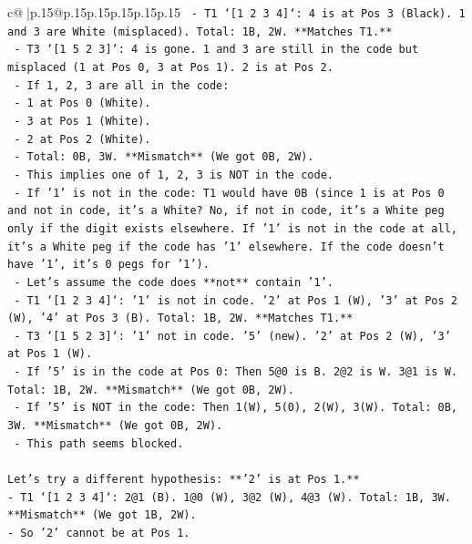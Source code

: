 \documentclass{article}
\begin{document}
{\begin{supertabular}{c@{$\;$}|p{.15\linewidth}@{}p{.15\linewidth}p{.15\linewidth}p{.15\linewidth}p{.15\linewidth}p{.15\linewidth}}
{{{\texttt{        {-} T1 `{[}1 2 3 4{]}`: 4 is at Pos 3 (Black). 1 and 3 are White (misplaced). Total: 1B, 2W. **Matches T1.**} \\
\texttt{        {-} T3 `{[}1 5 2 3{]}`: 4 is gone. 1 and 3 are still in the code but misplaced (1 at Pos 0, 3 at Pos 1). 2 is at Pos 2.} \\
\texttt{        {-} If 1, 2, 3 are all in the code:} \\
\texttt{          {-} 1 at Pos 0 (White).} \\
\texttt{          {-} 3 at Pos 1 (White).} \\
\texttt{          {-} 2 at Pos 2 (White).} \\
\texttt{          {-} Total: 0B, 3W. **Mismatch** (We got 0B, 2W).} \\
\texttt{        {-} This implies one of 1, 2, 3 is NOT in the code.} \\
\texttt{        {-} If '1' is not in the code: T1 would have 0B (since 1 is at Pos 0 and not in code, it's a White? No, if not in code, it's a White peg only if the digit exists elsewhere. If '1' is not in the code at all, it's a White peg if the code has '1' elsewhere. If the code doesn't have '1', it's 0 pegs for '1').} \\
\texttt{        {-} Let's assume the code does **not** contain '1'.} \\
\texttt{          {-} T1 `{[}1 2 3 4{]}`: '1' is not in code. '2' at Pos 1 (W), '3' at Pos 2 (W), '4' at Pos 3 (B). Total: 1B, 2W. **Matches T1.**} \\
\texttt{          {-} T3 `{[}1 5 2 3{]}`: '1' not in code. '5' (new). '2' at Pos 2 (W), '3' at Pos 1 (W).} \\
\texttt{          {-} If '5' is in the code at Pos 0: Then 5@0 is B. 2@2 is W. 3@1 is W. Total: 1B, 2W. **Mismatch** (We got 0B, 2W).} \\
\texttt{          {-} If '5' is NOT in the code: Then 1(W), 5(0), 2(W), 3(W). Total: 0B, 3W. **Mismatch** (We got 0B, 2W).} \\
\texttt{          {-} This path seems blocked.} \\
\\ 
\texttt{Let's try a different hypothesis: **'2' is at Pos 1.**} \\
\texttt{{-} T1 `{[}1 2 3 4{]}`: 2@1 (B). 1@0 (W), 3@2 (W), 4@3 (W). Total: 1B, 3W. **Mismatch** (We got 1B, 2W).} \\
\texttt{{-} So '2' cannot be at Pos 1.} \\
\\ 
}}}
\end{supertabular}}
\end{document}
